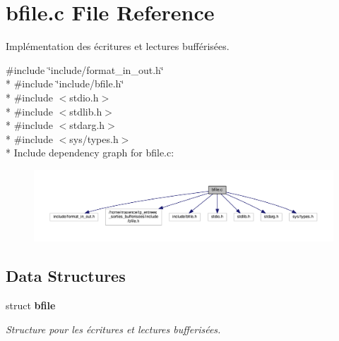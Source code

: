 \section{bfile.\+c File Reference}
\label{bfile_8c}


Implémentation des écritures et lectures bufférisées.  


{\ttfamily \#include \char`\"{}include/format\+\_\+in\+\_\+out.\+h\char`\"{}}\\*
{\ttfamily \#include \char`\"{}include/bfile.\+h\char`\"{}}\\*
{\ttfamily \#include $<$stdio.\+h$>$}\\*
{\ttfamily \#include $<$stdlib.\+h$>$}\\*
{\ttfamily \#include $<$stdarg.\+h$>$}\\*
{\ttfamily \#include $<$sys/types.\+h$>$}\\*
Include dependency graph for bfile.\+c\+:
\nopagebreak
\begin{figure}[H]
\begin{center}
\leavevmode
\includegraphics[width=350pt]{bfile_8c__incl}
\end{center}
\end{figure}
\subsection*{Data Structures}
\begin{DoxyCompactItemize}
\item 
struct {\bf bfile}
\begin{DoxyCompactList}\small\item\em Structure pour les écritures et lectures bufferisées. \end{DoxyCompactList}\end{DoxyCompactItemize}
